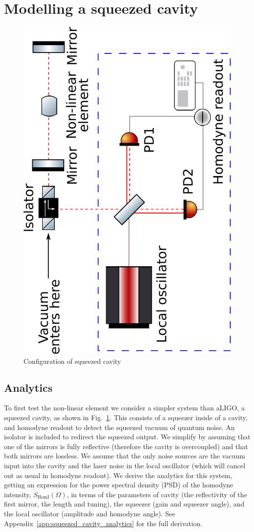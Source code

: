 \documentclass[aps,pra,superscriptaddress,reprint,nofootinbib]{revtex4-1}
\begin{document}
\section{Modelling a squeezed cavity} %
\label{sec:sqzcavity}

\begin{figure}
	\begin{center}
	\includegraphics[height=0.45\textwidth, angle=-90]{figures/squeezed_cavity.pdf}
	\end{center}
	\caption{Configuration of squeezed cavity}
	\label{fig:squeezed_cavity}
\end{figure}

\subsection{Analytics}

To first test the non-linear element we consider a simpler system than aLIGO, a squeezed cavity, as shown in Fig.~\ref{fig:squeezed_cavity}. This consists of a squeezer inside of a cavity, and homodyne readout to detect the squeezed vacuum of quantum noise. An isolator is included to redirect the squeezed output. We simplify by assuming that one of the mirrors is fully reflective (therefore the cavity is overcoupled) and that both mirrors are lossless. We assume that the only noise sources are the vacuum input into the cavity and the laser noise in the local oscillator (which will cancel out as usual in homodyne readout).
We derive the analytics for this system, getting an expression for the power spectral density (PSD) of the homodyne intensity, $S_{\mathrm{HomI}}(\Omega)$, in terms of the parameters of cavity (the reflectivity of the first mirror, the length and tuning), the squeezer (gain and squeezer angle), and the local oscillator (amplitude and homodyne angle). See Appendix~\ref{app:squeezed_cavity_analytics} for the full derivation.
\end{document}
